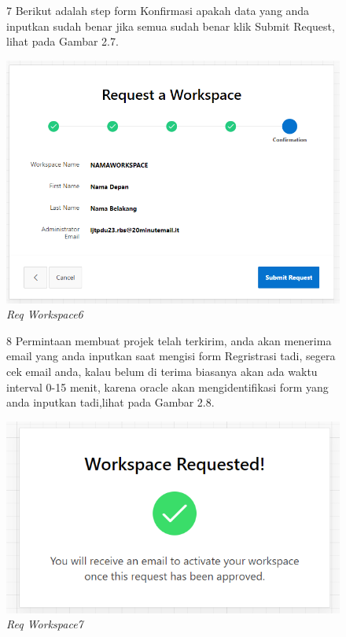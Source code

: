 \begin{itemize}
        \begin{figure}[!htbp]
        \item[7]Berikut adalah step form Konfirmasi apakah data yang anda inputkan sudah benar jika semua sudah benar klik Submit Request, lihat pada Gambar 2.7.
        \begin{center}
        \includegraphics[scale=0.5]{figures/7.png}
        \caption{\textit{Req Workspace6}}
        \end{center}
        \end{figure}
        
        \begin{figure}[!htbp]
        \item[8]Permintaan membuat projek telah terkirim, anda akan menerima email yang anda inputkan saat mengisi form Regristrasi tadi, segera cek email anda, kalau belum di terima biasanya akan ada waktu interval 0-15 menit, karena oracle akan mengidentifikasi form yang anda inputkan tadi,lihat pada Gambar 2.8.
        \begin{center}
        \includegraphics[scale=0.5]{figures/8.png}
        \caption{\textit{Req Workspace7}}
        \end{center}
        \end{figure}
        

\end{itemize}
